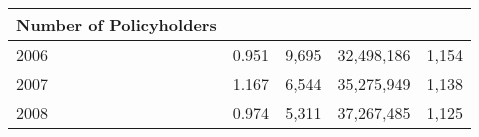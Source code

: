 \documentclass[]{book}
\theoremstyle{definition}
\theoremstyle{definition}
\theoremstyle{definition}
\theoremstyle{remark}
\begin{document}
\begin{longtable}[]{@{}lrrrr@{}}
\begin{minipage}[b]{0.16\columnwidth}
Number of Policyholders\strut
\end{minipage}\tabularnewline
\midrule
\endhead
\begin{minipage}[t]{0.17\columnwidth}\raggedright\strut
2006\strut
\end{minipage} & \begin{minipage}[t]{0.14\columnwidth}\raggedleft\strut
0.951\strut
\end{minipage} & \begin{minipage}[t]{0.17\columnwidth}\raggedleft\strut
9,695\strut
\end{minipage} & \begin{minipage}[t]{0.16\columnwidth}\raggedleft\strut
32,498,186\strut
\end{minipage} & \begin{minipage}[t]{0.16\columnwidth}\raggedleft\strut
1,154\strut
\end{minipage}\tabularnewline
\begin{minipage}[t]{0.17\columnwidth}\raggedright\strut
2007\strut
\end{minipage} & \begin{minipage}[t]{0.14\columnwidth}\raggedleft\strut
1.167\strut
\end{minipage} & \begin{minipage}[t]{0.17\columnwidth}\raggedleft\strut
6,544\strut
\end{minipage} & \begin{minipage}[t]{0.16\columnwidth}\raggedleft\strut
35,275,949\strut
\end{minipage} & \begin{minipage}[t]{0.16\columnwidth}\raggedleft\strut
1,138\strut
\end{minipage}\tabularnewline
\begin{minipage}[t]{0.17\columnwidth}\raggedright\strut
2008\strut
\end{minipage} & \begin{minipage}[t]{0.14\columnwidth}\raggedleft\strut
0.974\strut
\end{minipage} & \begin{minipage}[t]{0.17\columnwidth}\raggedleft\strut
5,311\strut
\end{minipage} & \begin{minipage}[t]{0.16\columnwidth}\raggedleft\strut
37,267,485\strut
\end{minipage} & \begin{minipage}[t]{0.16\columnwidth}\raggedleft\strut
1,125\strut
\end{minipage}\tabularnewline

\end{longtable}
\end{document}

